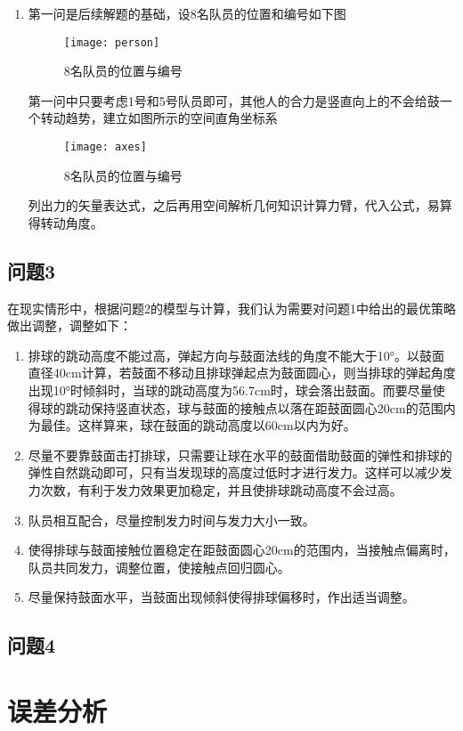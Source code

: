 \documentclass[withoutpreface,bwprint]{cumcmthesis} %
\begin{document}
\begin{enumerate}
\item 第一问是后续解题的基础，设8名队员的位置和编号如下图
\begin{figure}[!h]
    \centering
    \texttt{[image: person]}
    \caption{8名队员的位置与编号}
    \label{fig:members}
\end{figure}
第一问中只要考虑1号和5号队员即可，其他人的合力是竖直向上的不会给鼓一个转动趋势，建立如图所示的空间直角坐标系
\begin{figure}[!h]
    \centering
    \texttt{[image: axes]}
    \caption{8名队员的位置与编号}
    \label{fig:p3}
\end{figure}
列出力的矢量表达式，之后再用空间解析几何知识计算力臂，代入公式，易算得转动角度。
\end{enumerate}

\subsection{问题3}

在现实情形中，根据问题2的模型与计算，我们认为需要对问题1中给出的最优策略做出调整，调整如下：
\begin{enumerate}
\item 排球的跳动高度不能过高，弹起方向与鼓面法线的角度不能大于10°。以鼓面直径40cm计算，若鼓面不移动且排球弹起点为鼓面圆心，则当排球的弹起角度出现10°时倾斜时，当球的跳动高度为56.7cm时，球会落出鼓面。而要尽量使得球的跳动保持竖直状态，球与鼓面的接触点以落在距鼓面圆心20cm的范围内为最佳。这样算来，球在鼓面的跳动高度以60cm以内为好。
\item 尽量不要靠鼓面击打排球，只需要让球在水平的鼓面借助鼓面的弹性和排球的弹性自然跳动即可，只有当发现球的高度过低时才进行发力。这样可以减少发力次数，有利于发力效果更加稳定，并且使排球跳动高度不会过高。
\item 队员相互配合，尽量控制发力时间与发力大小一致。
\item 使得排球与鼓面接触位置稳定在距鼓面圆心20cm的范围内，当接触点偏离时，队员共同发力，调整位置，使接触点回归圆心。
\item 尽量保持鼓面水平，当鼓面出现倾斜使得排球偏移时，作出适当调整。
\end{enumerate}

\subsection{问题4}

\section{误差分析}
\end{document}

